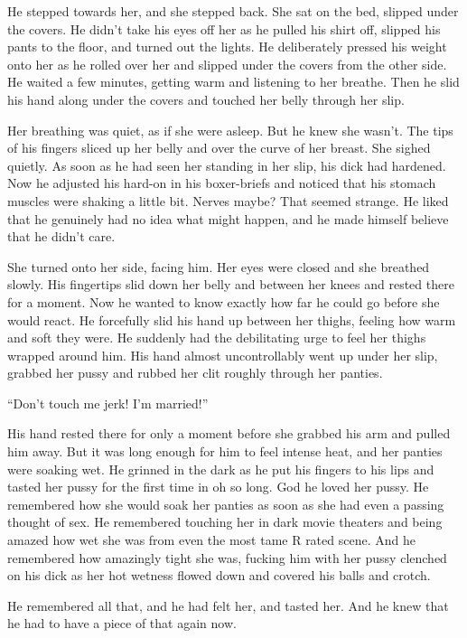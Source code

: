 \documentclass[letterpaper]{article}
\begin{document}
He stepped towards her, and she stepped back. She sat on the bed, slipped under the covers. He didn't take his eyes off her as he pulled his shirt off, slipped his pants to the floor, and turned out the lights.
He deliberately pressed his weight onto her as he rolled over her and slipped under the covers from the other side. He waited a few minutes, getting warm and listening to her breathe. 
Then he slid his hand along under the covers and touched her belly through her slip.

Her breathing was quiet, as if she were asleep. But he knew she wasn't. 
The tips of his fingers sliced up her belly and over the curve of her breast. She sighed quietly.
As soon as he had seen her standing in her slip, his dick had hardened. Now he adjusted his hard-on in his boxer-briefs and noticed that his stomach muscles were shaking a little bit.
Nerves maybe? That seemed strange. He liked that he genuinely had no idea what might happen, and he made himself believe that he didn't care.

She turned onto her side, facing him. Her eyes were closed and she breathed slowly. His fingertips slid down her belly and between her knees and rested there for a moment.
Now he wanted to know exactly how far he could go before she would react. He forcefully slid his hand up between her thighs, feeling how warm and soft they were. 
He suddenly had the debilitating urge to feel her thighs wrapped around him. 
His hand almost uncontrollably went up under her slip, grabbed her pussy and rubbed her clit roughly through her panties.

``Don't touch me jerk! I'm married!''

His hand rested there for only a moment before she grabbed his arm and pulled him away. 
But it was long enough for him to feel intense heat, and her panties were soaking wet. He grinned in the dark as he put his fingers to his lips and tasted her pussy for the first time in oh so long.
God he loved her pussy. He remembered how she would soak her panties as soon as she had even a passing thought of sex. 
He remembered touching her in dark movie theaters and being amazed how wet she was from even the most tame R rated scene.
And he remembered how amazingly tight she was, fucking him with her pussy clenched on his dick as her hot wetness flowed down and covered his balls and crotch.

He remembered all that, and he had felt her, and tasted her. And he knew that he had to have a piece of that again now.
\end{document}
